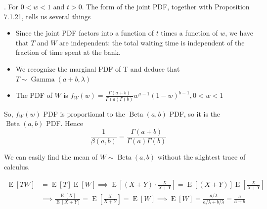 \documentclass[8pt]{beamer}
\newcommand{\expec}[1]{\operatorname{E}\left[ #1 \right]}
\newcommand{\Beta}[2]{\operatorname{Beta}\!\left(#1, #2\right)}
\newcommand{\GammaDist}[2]{\operatorname{Gamma}\!\left(#1, #2\right)}
\begin{document}
\begin{frame}{.}
    For $0 < w< 1$ and $t>0$. The form of the joint PDF, together with Proposition 7.1.21, tells us several things
    \begin{itemize}
        \item Since the joint PDF factors into a function of $t$ times a function of $w$, we have that $T$ and $W$ are independent: the total waiting time is independent of the fraction of time spent at the bank.
        \item We recognize the marginal PDF of T and deduce that $T \sim \GammaDist{a+b}{\lambda}$
        \item The PDF of $W$ is $f_W(w) = \frac{\Gamma(a+b)}{\Gamma(a) \Gamma(b)} w^{a-1} (1-w)^{b-1}, 0<w<1$
    \end{itemize}

    So, $f_W(w)$ PDF is proportional to the $\Beta{a}{b}$ PDF, so it is the $\Beta{a}{b}$ PDF.
    Hence
    \[
        \frac{1}{\beta (a,b)} = \frac{\Gamma(a+b)}{\Gamma(a) \Gamma(b)}
    \]

    We can easily find the mean of $W \sim \Beta{a}{b}$ without the slightest trace of calculus.

    \[
        \begin{aligned}
            \expec{TW} &= \expec{T} \expec{W} \implies \expec{(X+Y) \cdot \frac{X}{X+Y}} = \expec{(X+Y)} \expec{\frac{X}{X+Y}} \\
            &\implies  \frac{\expec{X}}{\expec{X+Y}} = \expec{\frac{X}{X+Y}} = \expec{W} \implies \expec{W} = \frac{a/\lambda}{ a/\lambda + b/\lambda} = \frac{a}{a+b}
        \end{aligned}
    \]
\end{frame}
\end{document}

